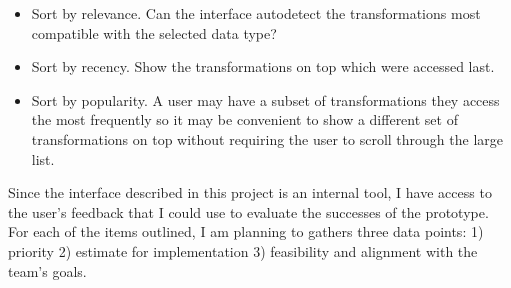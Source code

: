 \documentclass[12pt,letterpaper]{article}
\begin{document}
\begin{itemize}
    \item Sort by relevance. Can the interface autodetect the transformations most compatible with the selected data type?
    \item Sort by recency. Show the transformations on top which were accessed last.
    \item Sort by popularity. A user may have a subset of transformations they access the most frequently so it may be convenient to show a different set of transformations on top without requiring the user to scroll through the large list. 
\end{itemize}

Since the interface described in this project is an internal tool, I have access to the user's feedback that I could use to evaluate the successes of the prototype. For each of the items outlined, I am planning to gathers three data points: 1) priority 2) estimate for implementation 3) feasibility and alignment with the team's goals.
\end{document}
